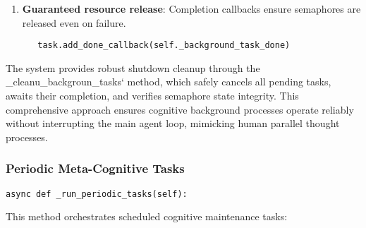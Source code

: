 \documentclass[12pt,a4paper]{article}
\begin{document}
\begin{enumerate}[label=\arabic*.]
    \item \textbf{Guaranteed resource release}: Completion callbacks ensure semaphores are released even on failure.
    \begin{pageablecode}
    \begin{verbatim}
   task.add_done_callback(self._background_task_done)
    \end{verbatim}
    \end{pageablecode}
\end{enumerate}

The system provides robust shutdown cleanup through the \1\_cleanu\1\_backgroun\1\_tasks` method, which safely cancels all pending tasks, awaits their completion, and verifies semaphore state integrity. This comprehensive approach ensures cognitive background processes operate reliably without interrupting the main agent loop, mimicking human parallel thought processes.

\subsubsection*{Periodic Meta-Cognitive Tasks}
\begin{pageablecode}
\begin{verbatim}
async def _run_periodic_tasks(self):
\end{verbatim}
\end{pageablecode}
This method orchestrates scheduled cognitive maintenance tasks:
\end{document}
